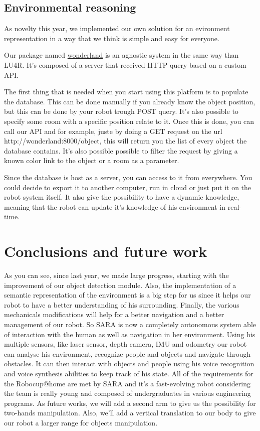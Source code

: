 \documentclass[runningheads,a4paper]{llncs}
\begin{document}
\subsection{Environmental reasoning}
\tab As novelty this year, we implemented our own solution for an evironment representation in a way that we think is simple and easy for everyone. 

Our package named \href{http://github.com/walkingmachine/wonderland}{wonderland} is an agnostic system in the same way than LU4R. It’s composed of a server that received HTTP query based on a custom API. 

The first thing that is needed when you start using this platform is to populate the database. This can be done manually if you already know the object position, but this can be done by your robot trough POST query. It’s also possible to specify some room with a specific position relate to it. Once this is done, you can call our API and for example, juste by doing a GET request on the url http://wonderland:8000/object, this will return you the list of every object the database contains. It’s also possible possible to filter the request by giving a known color link to the object or a room as a parameter. 

Since the database is host as a server, you can access to it from everywhere. You could decide to export it to another computer, run in cloud or just put it on the robot system itself. It also give the possibility to have a dynamic knowledge, meaning that the robot can update it’s knowledge of his environment in real-time. 



\section{Conclusions and future work}
\tab As you can see, since last year, we made large progress, starting with the improvement of our object detection module. Also, the implementation of a semantic representation of the environment is a big step for us since it helps our robot to have a better understanding of his surrounding. Finally, the various mechanicals modifications will help for a better navigation and a better management of our robot. So SARA is now a completely autonomous system able of interaction with the human as well as navigation in her environment. Using his multiple sensors, like laser sensor, depth camera, IMU and odometry our robot can analyse his environment, recognize people and objects and navigate through obstacles. It can then interact with objects and people using his voice recognition and voice synthesis abilities to keep track of his state. All of the requirements for the Robocup@home are met by SARA and it's a fast-evolving robot considering the team is really young and composed of undergraduates in various engineering programs. As future works, we will add a second arm to give us the possibility for two-hands manipulation. Also, we'll add a vertical translation to our body to give our robot a larger range for objects manipulation.\\
\end{document}
